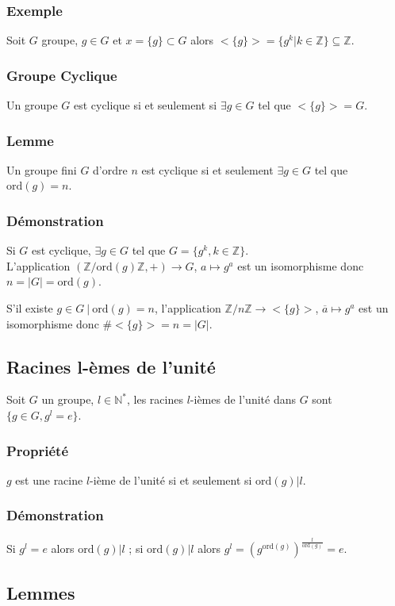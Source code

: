 \documentclass[a4paper,10pt]{book} %
\newcommand{\N}{\mathbb{N}}
\newcommand{\Z}{\mathbb{Z}}
\newcommand{\abs}[1]{\left|#1\right|}
\newcommand{\tq}{~|~}
\newcommand{\ord}{\mathrm{ord}}
\begin{document}
\subsubsection{Exemple}
Soit $G$ groupe, $g\in G$ et $x=\{g\} \subset G$ alors $<\{g\}> = \{ g^k | k\in \Z \} \subseteq \Z$.

\subsubsection{Groupe Cyclique}
Un groupe $G$ est cyclique si et seulement si $\exists g\in G$ tel que $<\{g\}>= G$.

\subsubsection{Lemme}
Un groupe fini $G$ d'ordre $n$ est cyclique si et seulement $\exists g\in G$ tel que $\ord(g) = n$.

\subsubsection{Démonstration}
Si $G$ est cyclique, $\exists g \in G$ tel que $G = \{ g^k, k\in \Z \}$.\\ L'application $(\Z/\ord(g)\Z ,+)\rightarrow G$, $a\mapsto g^a$ est un isomorphisme donc $n =\abs{G}=\ord(g)$.

S'il existe $g\in G \tq \ord(g) = n$, l'application $\Z/n\Z \rightarrow <\{g\}>$, $\overline{a}\mapsto g^a$ est un isomorphisme donc $\#<\{g\}> = n = \abs{G}$.

\subsection{Racines l-èmes de l'unité}
Soit $G$ un groupe, $l\in \N^*$, les racines $l$-ièmes de l'unité dans $G$ sont $\{g\in G, g^l=e\}$.

\subsubsection{Propriété}
$g$ est une racine $l$-ième de l'unité si et seulement si $\ord(g)|l$.

\subsubsection{Démonstration}
Si $g^l=e$ alors $\ord(g)|l$ ; si $\ord(g)|l$ alors $g^l=(g^{\ord(g)})^{\frac{l}{\ord(g)}}=e$.

\subsection{Lemmes}
\end{document}
